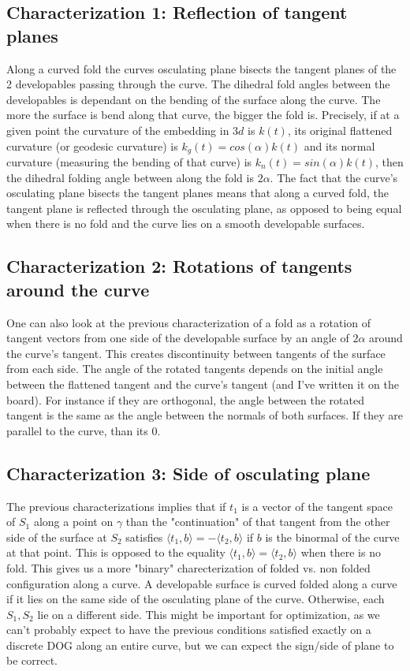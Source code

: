 \documentclass{article}
\theoremstyle{definition}
\begin{document}
\subsection{Characterization 1: Reflection of tangent planes}
Along a curved fold the curves osculating plane bisects the tangent planes of the 2 developables passing through the curve. The dihedral fold angles between the developables is dependant on the bending of the surface along the curve. The more the surface is bend along that curve, the bigger the fold is. Precisely, if at a given point the curvature of the embedding in $3d$ is $k(t)$, its original flattened curvature (or geodesic curvature) is $k_g(t) = cos(\alpha)k(t)$ and its normal curvature (measuring the bending of that curve) is $k_n(t) = sin(\alpha)k(t)$, then the dihedral folding angle between along the fold is $2\alpha$. The fact that the curve's osculating plane bisects the tangent planes means that along a curved fold, the tangent plane is reflected through the osculating plane, as opposed to being equal when there is no fold and the curve lies on a smooth developable surfaces.

\subsection{Characterization 2: Rotations of tangents around the curve}
One can also look at the previous characterization of a fold as a rotation of tangent vectors from one side of the developable surface by an angle of $2\alpha$ around the curve's tangent. This creates discontinuity between tangents of the surface from each side. The angle of the rotated tangents depends on the initial angle between the flattened tangent and the curve's tangent (and I've written it on the board). For instance if they are orthogonal, the angle between the rotated tangent is the same as the angle between the normals of both surfaces. If they are parallel to the curve, than its 0.

\subsection{Characterization 3: Side of osculating plane}
The previous characterizations implies that if $t_1$ is a vector of the tangent space of $S_1$ along a point on $\gamma$ than the "continuation" of that tangent from the other side of the surface at $S_2$ satisfies $\langle t_1,b \rangle = -\langle t_2,b \rangle$ if $b$ is the binormal of the curve at that point. This is opposed to the equality $\langle t_1,b \rangle = \langle t_2,b \rangle$ when there is no fold. This gives us a more "binary" charecterization of folded vs. non folded configuration along a curve. A developable surface is curved folded along a curve if it lies on the same side of the osculating plane of the curve. Otherwise, each $S_1,S_2$ lie on a different side.
This might be important for optimization, as we can't probably expect to have the previous conditions satisfied exactly on a discrete DOG along an entire curve, but we can expect the sign/side of plane to be correct.
\end{document}
